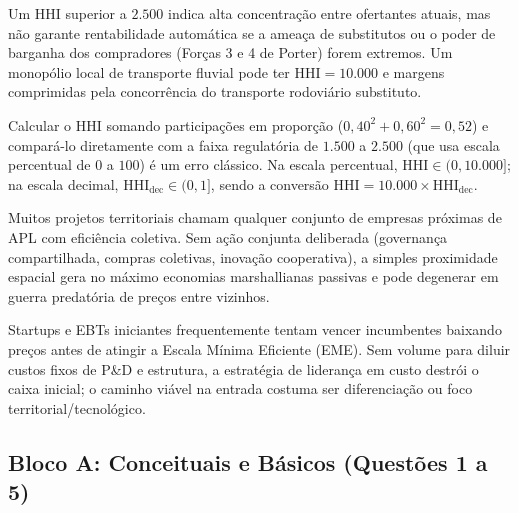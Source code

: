 \begin{boxErro}
Um $\text{HHI}$ superior a $2.500$ indica alta concentração entre ofertantes atuais, mas não garante rentabilidade automática se a ameaça de substitutos ou o poder de barganha dos compradores (Forças 3 e 4 de Porter) forem extremos. Um monopólio local de transporte fluvial pode ter $\text{HHI} = 10.000$ e margens comprimidas pela concorrência do transporte rodoviário substituto.
\end{boxErro}

\begin{boxErro}
Calcular o $\text{HHI}$ somando participações em proporção ($0{,}40^2 + 0{,}60^2 = 0{,}52$) e compará-lo diretamente com a faixa regulatória de $1.500$ a $2.500$ (que usa escala percentual de $0$ a $100$) é um erro clássico. Na escala percentual, $\text{HHI} \in (0, 10.000]$; na escala decimal, $\text{HHI}_{\text{dec}} \in (0, 1]$, sendo a conversão $\text{HHI} = 10.000 \times \text{HHI}_{\text{dec}}$.
\end{boxErro}

\begin{boxErro}
Muitos projetos territoriais chamam qualquer conjunto de empresas próximas de APL com eficiência coletiva. Sem ação conjunta deliberada (governança compartilhada, compras coletivas, inovação cooperativa), a simples proximidade espacial gera no máximo economias marshallianas passivas e pode degenerar em guerra predatória de preços entre vizinhos.
\end{boxErro}

\begin{boxErro}
Startups e EBTs iniciantes frequentemente tentam vencer incumbentes baixando preços antes de atingir a Escala Mínima Eficiente (EME). Sem volume para diluir custos fixos de P\&D e estrutura, a estratégia de liderança em custo destrói o caixa inicial; o caminho viável na entrada costuma ser diferenciação ou foco territorial/tecnológico.
\end{boxErro}


\subsection*{Bloco A: Conceituais e Básicos (Questões 1 a 5)}

